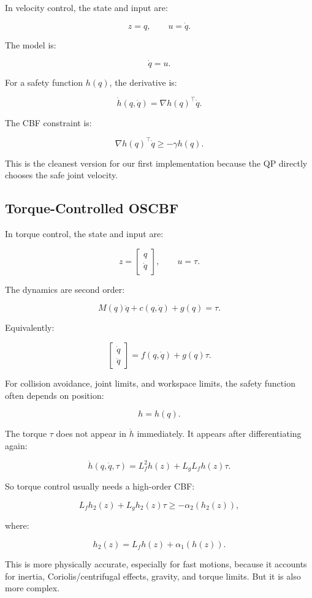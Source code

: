 \documentclass[11pt]{article}
\begin{document}
In velocity control, the state and input are:

\[
z = q,
\qquad
u = \dot{q}.
\]

The model is:

\[
\dot{q} = u.
\]

For a safety function $h(q)$, the derivative is:

\[
\dot{h}(q, \dot{q})
= \nabla h(q)^\top \dot{q}.
\]

The CBF constraint is:

\[
\nabla h(q)^\top \dot{q}
\ge
-\gamma h(q).
\]

This is the cleanest version for our first implementation because the QP
directly chooses the safe joint velocity.

\subsection{Torque-Controlled OSCBF}

In torque control, the state and input are:

\[
z =
\begin{bmatrix}
q \\
\dot{q}
\end{bmatrix},
\qquad
u = \tau.
\]

The dynamics are second order:

\[
M(q)\ddot{q} + c(q,\dot{q}) + g(q) = \tau.
\]

Equivalently:

\[
\begin{bmatrix}
\dot{q} \\
\ddot{q}
\end{bmatrix}
=
f(q,\dot{q}) + g(q)\tau.
\]

For collision avoidance, joint limits, and workspace limits, the safety
function often depends on position:

\[
h = h(q).
\]

The torque $\tau$ does not appear in $\dot{h}$ immediately. It appears after
differentiating again:

\[
\ddot{h}(q,\dot{q},\tau)
= L_f^2 h(z) + L_g L_f h(z)\tau.
\]

So torque control usually needs a high-order CBF:

\[
L_f h_2(z) + L_g h_2(z)\tau
\ge
-\alpha_2(h_2(z)),
\]

where:

\[
h_2(z) = L_f h(z) + \alpha_1(h(z)).
\]

This is more physically accurate, especially for fast motions, because it
accounts for inertia, Coriolis/centrifugal effects, gravity, and torque limits.
But it is also more complex.
\end{document}
